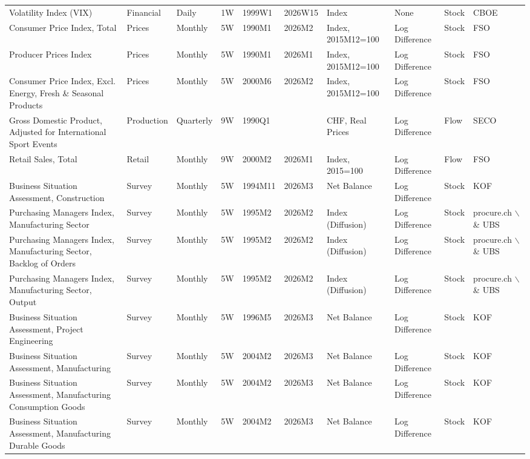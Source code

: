 \begin{table}[ht]
\begin{tabular}{llllllllll}
  Volatility Index (VIX) & Financial & Daily & 1W & 1999W1 & 2026W15 & Index & None & Stock & CBOE \\ 
  Consumer Price Index, Total & Prices & Monthly & 5W & 1990M1 & 2026M2 & Index, 2015M12=100 & Log Difference & Stock & FSO \\ 
  Producer Prices Index & Prices & Monthly & 5W & 1990M1 & 2026M1 & Index, 2015M12=100 & Log Difference & Stock & FSO \\ 
  Consumer Price Index, Excl. Energy, Fresh \& Seasonal Products & Prices & Monthly & 5W & 2000M6 & 2026M2 & Index, 2015M12=100 & Log Difference & Stock & FSO \\ 
  Gross Domestic Product, Adjusted for International Sport Events & Production & Quarterly & 9W & 1990Q1 &  & CHF, Real Prices & Log Difference & Flow & SECO \\ 
  Retail Sales, Total & Retail & Monthly & 9W & 2000M2 & 2026M1 & Index, 2015=100 & Log Difference & Flow & FSO \\ 
  Business Situation Assessment, Construction & Survey & Monthly & 5W & 1994M11 & 2026M3 & Net Balance & Log Difference & Stock & KOF  \\ 
  Purchasing Managers Index, Manufacturing Sector & Survey & Monthly & 5W & 1995M2 & 2026M2 & Index (Diffusion) & Log Difference & Stock & procure.ch $\backslash$\& UBS \\ 
  Purchasing Managers Index, Manufacturing Sector, Backlog of Orders & Survey & Monthly & 5W & 1995M2 & 2026M2 & Index (Diffusion) & Log Difference & Stock & procure.ch $\backslash$\& UBS \\ 
  Purchasing Managers Index, Manufacturing Sector, Output & Survey & Monthly & 5W & 1995M2 & 2026M2 & Index (Diffusion) & Log Difference & Stock & procure.ch $\backslash$\& UBS \\ 
  Business Situation Assessment, Project Engineering & Survey & Monthly & 5W & 1996M5 & 2026M3 & Net Balance & Log Difference & Stock & KOF  \\ 
  Business Situation Assessment, Manufacturing & Survey & Monthly & 5W & 2004M2 & 2026M3 & Net Balance & Log Difference & Stock & KOF  \\ 
  Business Situation Assessment, Manufacturing Consumption Goods & Survey & Monthly & 5W & 2004M2 & 2026M3 & Net Balance & Log Difference & Stock & KOF  \\ 
  Business Situation Assessment, Manufacturing Durable Goods & Survey & Monthly & 5W & 2004M2 & 2026M3 & Net Balance & Log Difference & Stock & KOF  \\ 

\end{tabular}
\end{table}
